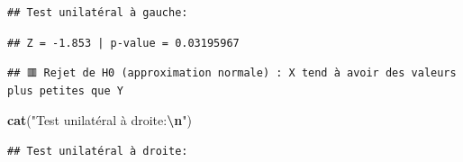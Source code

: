\documentclass[
  12pt,
]{article}
\newenvironment{Shaded}{\begin{snugshade}}{\end{snugshade}}
\newcommand{\DecValTok}[1]{\textcolor[rgb]{0.00,0.00,0.81}{#1}}
\newcommand{\FunctionTok}[1]{\textcolor[rgb]{0.13,0.29,0.53}{\textbf{#1}}}
\newcommand{\NormalTok}[1]{#1}
\newcommand{\SpecialCharTok}[1]{\textcolor[rgb]{0.81,0.36,0.00}{\textbf{#1}}}
\newcommand{\StringTok}[1]{\textcolor[rgb]{0.31,0.60,0.02}{#1}}
\begin{document}
\begin{verbatim}
## Test unilatéral à gauche:
\end{verbatim}

\begin{Shaded}
\end{Shaded}

\begin{verbatim}
## Z = -1.853 | p-value = 0.03195967
\end{verbatim}

\begin{Shaded}
\end{Shaded}

\begin{verbatim}
## 🟥 Rejet de H0 (approximation normale) : X tend à avoir des valeurs plus petites que Y
\end{verbatim}

\begin{Shaded}
\begin{Highlighting}[]
\FunctionTok{cat}\NormalTok{(}\StringTok{"Test unilatéral à droite:}\SpecialCharTok{\textbackslash{}n}\StringTok{"}\NormalTok{)}
\end{Highlighting}
\end{Shaded}

\begin{verbatim}
## Test unilatéral à droite:
\end{verbatim}

\begin{Shaded}
\end{Shaded}
\end{document}
